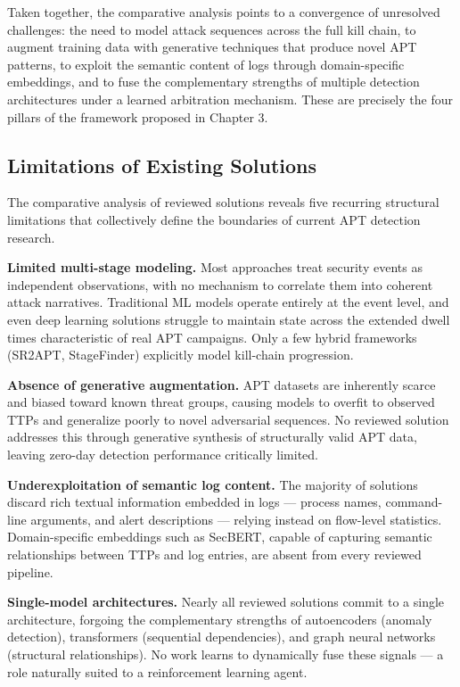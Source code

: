 Taken together, the comparative analysis points to a convergence of unresolved challenges: the need to model attack sequences across the full kill chain, to augment training data with generative techniques that produce novel APT patterns, to exploit the semantic content of logs through domain-specific embeddings, and to fuse the complementary strengths of multiple detection architectures under a learned arbitration mechanism. These are precisely the four pillars of the framework proposed in Chapter 3.

\subsection{Limitations of Existing Solutions}

The comparative analysis of reviewed solutions reveals five recurring structural limitations that collectively define the boundaries of current APT detection research.

\textbf{Limited multi-stage modeling.} Most approaches treat security events as independent observations, with no mechanism to correlate them into coherent attack narratives. Traditional ML models operate entirely at the event level, and even deep learning solutions struggle to maintain state across the extended dwell times characteristic of real APT campaigns. Only a few hybrid frameworks (SR2APT, StageFinder) explicitly model kill-chain progression.

\textbf{Absence of generative augmentation.} APT datasets are inherently scarce and biased toward known threat groups, causing models to overfit to observed TTPs and generalize poorly to novel adversarial sequences. No reviewed solution addresses this through generative synthesis of structurally valid APT data, leaving zero-day detection performance critically limited.

\textbf{Underexploitation of semantic log content.} The majority of solutions discard rich textual information embedded in logs — process names, command-line arguments, and alert descriptions — relying instead on flow-level statistics. Domain-specific embeddings such as SecBERT, capable of capturing semantic relationships between TTPs and log entries, are absent from every reviewed pipeline.

\textbf{Single-model architectures.} Nearly all reviewed solutions commit to a single architecture, forgoing the complementary strengths of autoencoders (anomaly detection), transformers (sequential dependencies), and graph neural networks (structural relationships). No work learns to dynamically fuse these signals — a role naturally suited to a reinforcement learning agent.

